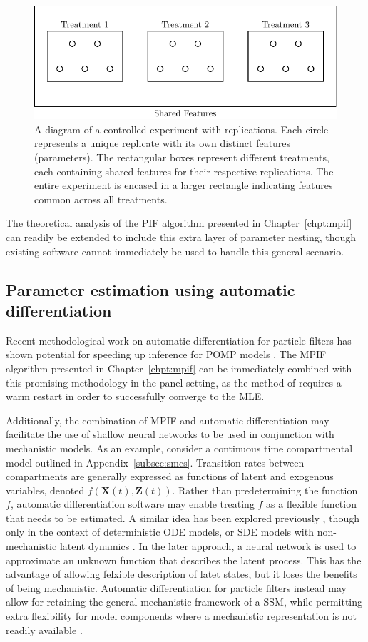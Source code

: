 \begin{figure}[h!]
    \centering
    \includegraphics[width=0.7\linewidth]{chapters/conclusion/nestedDesign.pdf}
    \caption[A diagram of a controlled experiment with replications.]{A diagram of a controlled experiment with replications. Each circle represents a unique replicate with its own distinct features (parameters). The rectangular boxes represent different treatments, each containing shared features for their respective replications. The entire experiment is encased in a larger rectangle indicating features common across all treatments.}
    \label{fig:controlled_experiment}
\end{figure}

The theoretical analysis of the PIF algorithm presented in Chapter~\ref{chpt:mpif} can readily be extended to include this extra layer of parameter nesting, though existing software cannot immediately be used to handle this general scenario.

\subsection*{Parameter estimation using automatic differentiation}

Recent methodological work on automatic differentiation for particle filters has shown potential for speeding up inference for POMP models \citep{tan24}.
The MPIF algorithm presented in Chapter~\ref{chpt:mpif} can be immediately combined with this promising methodology in the panel setting, as the method of \citet{tan24} requires a warm restart in order to successfully converge to the MLE.

Additionally, the combination of MPIF and automatic differentiation may facilitate the use of shallow neural networks to be used in conjunction with mechanistic models.
As an example, consider a continuous time compartmental model outlined in Appendix~\ref{subsec:smcs}.
Transition rates between compartments are generally expressed as functions of latent and exogenous variables, denoted $f(\bm{X}(t), \bm{Z}(t))$.
Rather than predetermining the function $f$, automatic differentiation software may enable treating $f$ as a flexible function that needs to be estimated.
A similar idea has been explored previously \citep{noordijk24,dandekar20}, though only in the context of deterministic ODE models, or SDE models with non-mechanistic latent dynamics \citep{lin24}.
In the later approach, a neural network is used to approximate an unknown function that describes the latent process. 
This has the advantage of allowing felxible description of latet states, but it loses the benefits of being mechanistic.
Automatic differentiation for particle filters instead may allow for retaining the general mechanistic framework of a SSM, while permitting extra flexibility for model components where a mechanistic representation is not readily available \citep{dandekar20}. 

